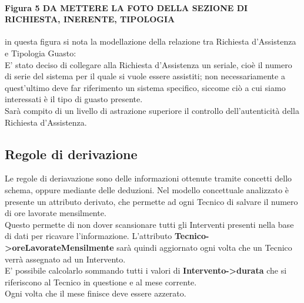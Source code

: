 \documentclass[legalpaper]{article}
\begin{document}
\paragraph{Figura 5  DA METTERE LA FOTO DELLA SEZIONE DI RICHIESTA, INERENTE, TIPOLOGIA}
in questa figura si nota la modellazione della relazione tra Richiesta d'Assistenza e Tipologia Guasto:\\
E' stato deciso di collegare alla Richiesta d'Assistenza un seriale, cioè il numero di serie del sistema per il quale si vuole essere assistiti; non necessariamente a quest'ultimo deve far riferimento un sistema specifico, siccome ciò a cui siamo interessati è il tipo di guasto presente.\\
Sarà compito di un livello di astrazione superiore il controllo dell'autenticità della Richiesta d'Assistenza.\\ 
\subsection{Regole di derivazione}
Le regole di deriavazione sono delle informazioni ottenute tramite concetti dello schema, oppure mediante delle deduzioni. Nel modello concettuale analizzato è presente un attributo derivato, 
che permette ad ogni Tecnico di salvare il numero di ore lavorate mensilmente.\\
Questo permette di non dover scansionare tutti gli Interventi presenti nella base di dati per ricavare l'informazione.
L'attributo \textbf{Tecnico->oreLavorateMensilmente} sarà quindi aggiornato ogni volta che un Tecnico verrà assegnato ad un Intervento.\\
E' possibile calcolarlo sommando tutti i valori di \textbf{Intervento->durata} che si riferiscono al Tecnico in questione e al mese corrente.\\
Ogni volta che il mese finisce deve essere azzerato.\\
\end{document}

